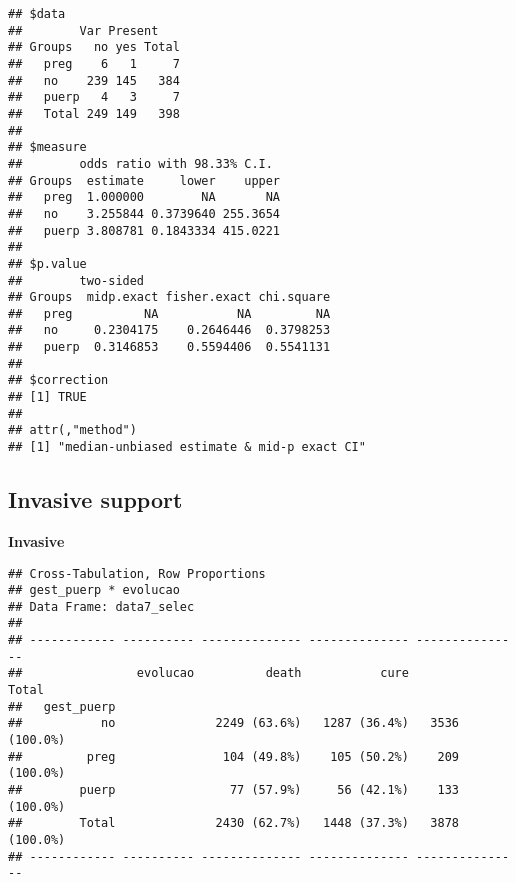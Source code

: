\documentclass[
]{article}
\newenvironment{Shaded}{\begin{snugshade}}{\end{snugshade}}
\newcommand{\DataTypeTok}[1]{\textcolor[rgb]{0.13,0.29,0.53}{#1}}
\newcommand{\KeywordTok}[1]{\textcolor[rgb]{0.13,0.29,0.53}{\textbf{#1}}}
\newcommand{\NormalTok}[1]{#1}
\newcommand{\OperatorTok}[1]{\textcolor[rgb]{0.81,0.36,0.00}{\textbf{#1}}}
\newcommand{\OtherTok}[1]{\textcolor[rgb]{0.56,0.35,0.01}{#1}}
\newcommand{\StringTok}[1]{\textcolor[rgb]{0.31,0.60,0.02}{#1}}
\begin{document}
\begin{verbatim}
## $data
##        Var Present
## Groups   no yes Total
##   preg    6   1     7
##   no    239 145   384
##   puerp   4   3     7
##   Total 249 149   398
## 
## $measure
##        odds ratio with 98.33% C.I.
## Groups  estimate     lower    upper
##   preg  1.000000        NA       NA
##   no    3.255844 0.3739640 255.3654
##   puerp 3.808781 0.1843334 415.0221
## 
## $p.value
##        two-sided
## Groups  midp.exact fisher.exact chi.square
##   preg          NA           NA         NA
##   no     0.2304175    0.2646446  0.3798253
##   puerp  0.3146853    0.5594406  0.5541131
## 
## $correction
## [1] TRUE
## 
## attr(,"method")
## [1] "median-unbiased estimate & mid-p exact CI"
\end{verbatim}

\hypertarget{invasive-support}{%
\subsection{Invasive support}\label{invasive-support}}

\textbf{Invasive}

\begin{Shaded}
\end{Shaded}

\begin{Shaded}
\end{Shaded}

\begin{verbatim}
## Cross-Tabulation, Row Proportions  
## gest_puerp * evolucao  
## Data Frame: data7_selec  
## 
## ------------ ---------- -------------- -------------- ---------------
##                evolucao          death           cure           Total
##   gest_puerp                                                         
##           no              2249 (63.6%)   1287 (36.4%)   3536 (100.0%)
##         preg               104 (49.8%)    105 (50.2%)    209 (100.0%)
##        puerp                77 (57.9%)     56 (42.1%)    133 (100.0%)
##        Total              2430 (62.7%)   1448 (37.3%)   3878 (100.0%)
## ------------ ---------- -------------- -------------- ---------------
\end{verbatim}
\end{document}
